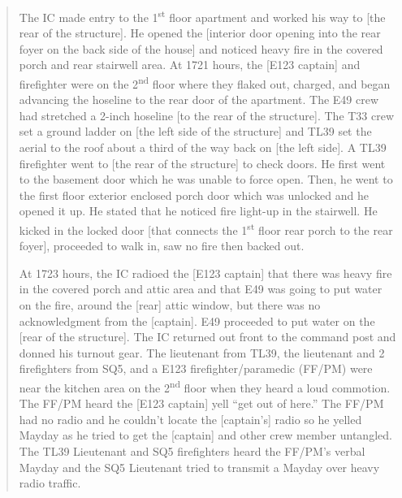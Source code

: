 \documentclass[12pt,oneside]{book}
\begin{document}
\begin{quote}
The IC made entry to the 1\textsuperscript{st} floor apartment and worked his way to [the rear of the structure]. He opened the [interior door opening into the rear foyer on the back side of the house] and noticed heavy fire in the covered porch and rear stairwell area. At 1721 hours, the [E123 captain] and firefighter were on the 2\textsuperscript{nd} floor where they flaked out, charged, and began advancing the hoseline to the rear door of the apartment. The E49 crew had stretched a 2-inch hoseline [to the rear of the structure]. The T33 crew set a ground ladder on [the left side of the structure] and TL39 set the aerial to the roof about a third of the way back on [the left side]. A TL39 firefighter went to [the rear of the structure] to check doors. He first went to the basement door which he was unable to force open. Then, he went to the first floor exterior enclosed porch door which was unlocked and he opened it up. He stated that he noticed fire light-up in the stairwell. He kicked in the locked door [that connects the 1\textsuperscript{st} floor rear porch to the rear foyer], proceeded to walk in, saw no fire then backed out.

At 1723 hours, the IC radioed the [E123 captain] that there was heavy fire in the covered porch and attic area and that E49 was going to put water on the fire, around the [rear] attic window, but there was no acknowledgment from the [captain]. E49 proceeded to put water on the [rear of the structure]. The IC returned out front to the command post and donned his turnout gear. The lieutenant from TL39, the lieutenant and 2 firefighters from SQ5, and a E123 firefighter/paramedic (FF/PM) were near the kitchen area on the 2\textsuperscript{nd} floor when they heard a loud commotion. The FF/PM heard the [E123 captain] yell ``get out of here.'' The FF/PM had no radio and he couldn't locate the [captain's] radio so he yelled Mayday as he tried to get the [captain] and other crew member untangled. The TL39 Lieutenant and SQ5 firefighters heard the FF/PM's verbal Mayday and the SQ5 Lieutenant tried to transmit a Mayday over heavy radio traffic.


\end{quote}
\end{document}
